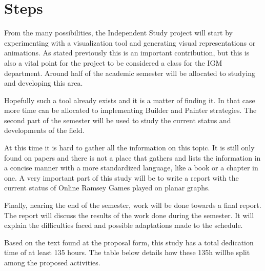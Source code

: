 \section*{Steps}

From the many possibilities, the Independent Study project will start by experimenting with a visualization tool and generating visual representations or animations. As stated previously this is an important contribution, but this is also a vital point for the project to be considered a class for the IGM department. Around half of the academic semester will be allocated to studying and developing this area.

Hopefully such a tool already exists and it is a matter of finding it. In that case more time can be allocated to implementing Builder and Painter strategies. The second part of the semester will be used to study the current status and developments of the field.

At this time it is hard to gather all the information on this topic. It is still only found on papers and there is not a place that gathers and lists the information in a concise manner with a more standardized language, like a book or a chapter in one. A very important part of this study will be to write a report with the current status of Online Ramsey Games played on planar graphs.

Finally, nearing the end of the semester, work will be done towards a final report. The report will discuss the results of the work done during the semester. It will explain the difficulties faced and possible adaptations made to the schedule.

Based on the text found at the proposal form, this study has a total dedication time of at least 135 hours. The table below details how these 135h willbe split among the proposed activities. 


